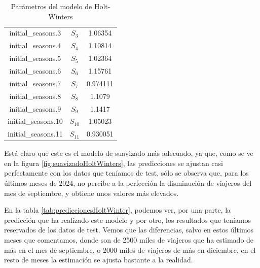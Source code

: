 \documentclass[a4paper,onecolumn]{extarticle}
\begin{document}
\begin{sloppypar}
\begin{table}[]
\begin{center}
\begin{tabular}{|c|c|c|}
            initial\_seasons.3  & $S_{3}$ & 1.06354 \\
            initial\_seasons.4  & $S_{4}$ & 1.10814 \\
            initial\_seasons.5  & $S_{5}$ & 1.02364 \\
            initial\_seasons.6  & $S_{6}$ & 1.15761 \\
            initial\_seasons.7  & $S_{7}$ & 0.974111 \\
            initial\_seasons.8  & $S_{8}$ & 1.1079 \\
            initial\_seasons.9  & $S_{9}$ & 1.1417 \\
            initial\_seasons.10 & $S_{10}$ & 1.05023 \\
            initial\_seasons.11 & $S_{11}$ & 0.930051 \\
            \hline
        \end{tabular}
        \caption{Parámetros del modelo de Holt-Winters}
        \label{tab:paramsHoltW}
    \end{center}
\end{table}

Está claro que este es el modelo de suavizado más adecuado, ya que, como se ve en la figura \ref{fig:suavizadoHoltWinters}, las predicciones se ajustan casi 
perfectamente con los datos que teníamos de test, sólo se observa que, para los últimos meses de 2024, no percibe a la perfección la disminución de viajeros
del mes de septiembre, y obtiene unos valores más elevados. 

En la tabla \ref{tab:prediccionesHoltWinter}, podemos ver, por una parte, la predicción que ha 
realizado este modelo y por otro, los resultados que teníamos reservados de los datos de test. Vemos que las diferencias, salvo en estos últimos meses que 
comentamos, donde son de 2500 miles de viajeros que ha estimado de más en el mes de septiembre, o 2000 miles de viajeros de más en diciembre, en el resto de 
meses la estimación se ajusta bastante a la realidad.


\end{sloppypar}
\end{document}
